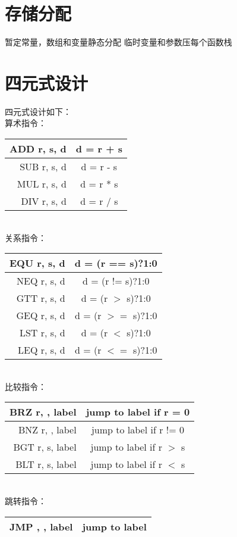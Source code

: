 \section{存储分配}
暂定常量，数组和变量静态分配
临时变量和参数压每个函数栈
\clearpage
\section{四元式设计}
四元式设计如下：\\
算术指令：\\
\begin{tabular}{r|c}
	\hline
	ADD  r, s, d & d = r + s \\ \hline
	SUB  r, s, d & d = r - s \\ \hline
	MUL  r, s, d & d = r * s \\ \hline
	DIV  r, s, d & d = r / s \\ \hline
\end{tabular} \\
关系指令：\\
\begin{tabular}{r|c}
	\hline
	EQU  r, s, d & d = (r == s)?1:0 \\ \hline
	NEQ  r, s, d & d = (r != s)?1:0 \\ \hline
	GTT  r, s, d & d = (r $>$ s)?1:0 \\ \hline
	GEQ  r, s, d & d = (r $>=$ s)?1:0 \\ \hline
	LST  r, s, d & d = (r $<$ s)?1:0 \\ \hline
	LEQ  r, s, d & d = (r $<=$ s)?1:0 \\ \hline
\end{tabular} \\
比较指令：\\
\begin{tabular}{r|c}
	\hline
	BRZ  r, , label & jump to label if r = 0 \\ \hline
	BNZ  r, , label & jump to label if r != 0 \\ \hline
	BGT  r, s, label & jump to label if r $>$ s \\ \hline
	BLT  r, s, label & jump to label if r $<$ s \\ \hline
\end{tabular}\\
跳转指令：\\
\begin{tabular}{r|c}
	\hline
	JMP  , , label & jump to label\\ \hline
\end{tabular}\\
